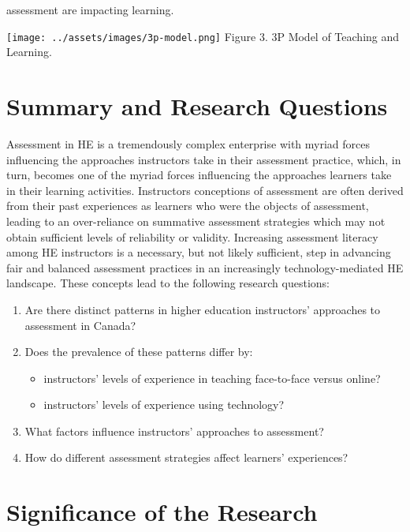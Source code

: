 \documentclass[
]{book}
\providecommand{\tightlist}{%
  \setlength{\itemsep}{0pt}\setlength{\parskip}{0pt}}
\begin{document}
assessment are impacting learning.

\texttt{[image: ../assets/images/3p-model.png]}
Figure 3. 3P Model of Teaching and Learning. \citep{biggsWhatStudentDoes1999, biggsTheoryPracticeCognitive1993}

\hypertarget{summary-and-research-questions}{%
\section{Summary and Research Questions}\label{summary-and-research-questions}}

Assessment in HE is a tremendously complex enterprise with myriad forces influencing the approaches instructors take in their assessment practice, which, in turn, becomes one of the myriad forces influencing the approaches learners take in their learning activities. Instructors conceptions of assessment are often derived from their past experiences as learners who were the objects of assessment, leading to an over-reliance on summative assessment strategies which may not obtain sufficient levels of reliability or validity. Increasing assessment literacy among HE instructors is a necessary, but not likely sufficient, step in advancing fair and balanced assessment practices in an increasingly technology-mediated HE landscape. These concepts lead to the following research questions:

\begin{enumerate}
\def\labelenumi{\arabic{enumi}.}
\tightlist
\item
  Are there distinct patterns in higher education instructors' approaches to assessment in Canada?
\item
  Does the prevalence of these patterns differ by:

  \begin{itemize}
  \tightlist
  \item
    instructors' levels of experience in teaching face-to-face versus online?
  \item
    instructors' levels of experience using technology?
  \end{itemize}
\item
  What factors influence instructors' approaches to assessment?
\item
  How do different assessment strategies affect learners' experiences?
\end{enumerate}

\hypertarget{significance-of-the-research}{%
\section{Significance of the Research}\label{significance-of-the-research}}
\end{document}
